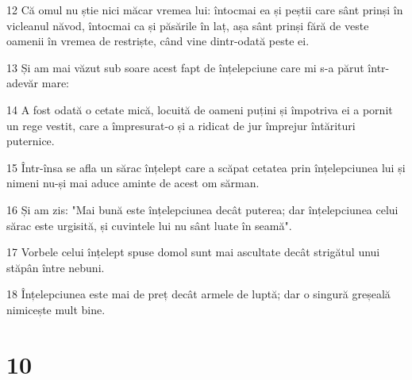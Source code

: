 \par 12 Că omul nu știe nici măcar vremea lui: întocmai ea și peștii care sânt prinși în vicleanul năvod, întocmai ca și păsările în laț, așa sânt prinși fără de veste oamenii în vremea de restriște, când vine dintr-odată peste ei.
\par 13 Și am mai văzut sub soare acest fapt de înțelepciune care mi s-a părut într-adevăr mare:
\par 14 A fost odată o cetate mică, locuită de oameni puțini și împotriva ei a pornit un rege vestit, care a împresurat-o și a ridicat de jur împrejur întărituri puternice.
\par 15 Într-însa se afla un sărac înțelept care a scăpat cetatea prin înțelepciunea lui și nimeni nu-și mai aduce aminte de acest om sărman.
\par 16 Și am zis: "Mai bună este înțelepciunea decât puterea; dar înțelepciunea celui sărac este urgisită, și cuvintele lui nu sânt luate în seamă".
\par 17 Vorbele celui înțelept spuse domol sunt mai ascultate decât strigătul unui stăpân între nebuni.
\par 18 Înțelepciunea este mai de preț decât armele de luptă; dar o singură greșeală nimicește mult bine.

\chapter{10}

